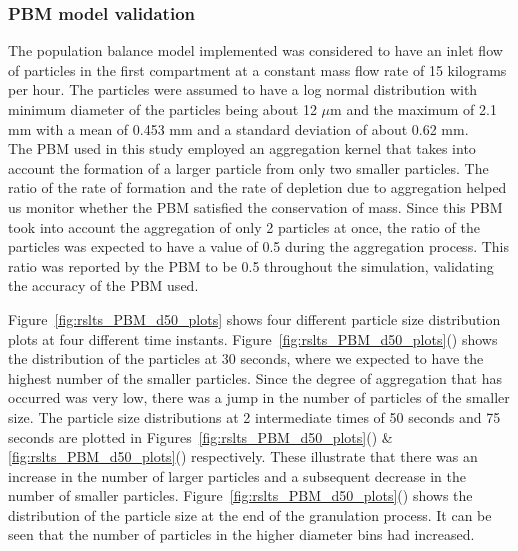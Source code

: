 \documentclass[preprint,11pt,authoryear]{elsarticle}
\begin{document}
\subsubsection{PBM model validation}
The population balance model implemented was considered to have an inlet flow of particles in the 
first compartment at a constant mass flow rate of 15 kilograms per hour. The particles were assumed 
to have a log normal distribution with minimum diameter of the particles being about 12 $\mu$m and the 
maximum of 2.1 mm with a mean of 0.453 mm and a standard deviation of about 0.62 mm. \\
The PBM used in this study employed an aggregation kernel that takes into account the formation of a 
larger particle from only two smaller particles. The ratio of the rate of formation and the rate of 
depletion due to aggregation helped us monitor whether the PBM satisfied the conservation of mass. 
Since this PBM took into account the aggregation of only 2 particles at once, the ratio of the particles 
was expected to have a value of 0.5 during the aggregation process. This ratio was reported by the PBM 
to be 0.5 throughout the simulation, validating the accuracy of the PBM used.

Figure~\ref{fig:rslts_PBM_d50_plots} shows four different particle size distribution plots at four 
different time instants. Figure~\ref{fig:rslts_PBM_d50_plots}() shows the distribution of 
the particles at 30 seconds, where we expected to have the highest number of the smaller particles. 
Since the degree of aggregation that has occurred was very low, there was a jump in the number of 
particles of the smaller size. The particle size distributions at 2 intermediate times of 50 seconds and 
75 seconds are plotted in Figures~\ref{fig:rslts_PBM_d50_plots}() \& \ref{fig:rslts_PBM_d50_plots}() respectively. These illustrate that there was an increase in 
the number of larger particles  and a subsequent decrease in the number of smaller particles. 
Figure~\ref{fig:rslts_PBM_d50_plots}() shows the distribution 
of the particle size at the end of the granulation process. It can be seen that the number of particles in 
the higher diameter bins had increased.
\end{document}
